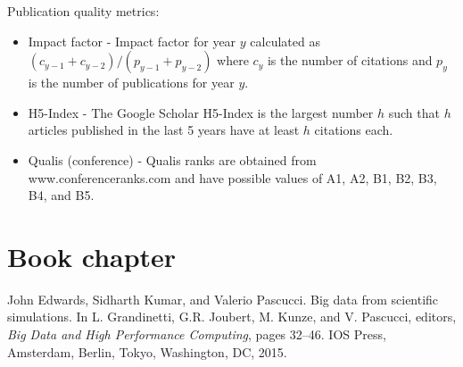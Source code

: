 \documentclass[margin,line]{res}
\newenvironment{tightitemize}{
\begin{itemize}
  \setlength{\itemsep}{1pt}
  \setlength{\parskip}{0pt}
  \setlength{\parsep}{0pt}
}{\end{itemize}
}
\begin{document}
\begin{resume}
\begin{footnotesize}
Publication quality metrics:
\vspace{-.4cm}
\begin{tightitemize}
\item Impact factor - Impact factor for year $y$ calculated as $(c_{y-1}+c_{y-2})/(p_{y-1}+p_{y-2})$ where $c_y$ is the number of citations and $p_y$ is the number of publications for year $y$.
\item H5-Index - The Google Scholar H5-Index is the largest number $h$ such that $h$ articles published in the last 5 years have at least $h$ citations each.
\item Qualis (conference) - Qualis ranks are obtained from www.conferenceranks.com and have possible values of A1, A2, B1, B2, B3, B4, and B5.
\end{tightitemize}
\end{footnotesize}





\section{\sc Book chapter}

John Edwards, Sidharth Kumar, and Valerio Pascucci. Big data from scientific simulations. In L. Grandinetti, G.R. Joubert, M. Kunze, and V. Pascucci, editors, \textit{Big Data and High Performance Computing}, pages 32--46. IOS Press, Amsterdam, Berlin, Tokyo, Washington, DC, 2015.

%




\end{resume}
\end{document}
